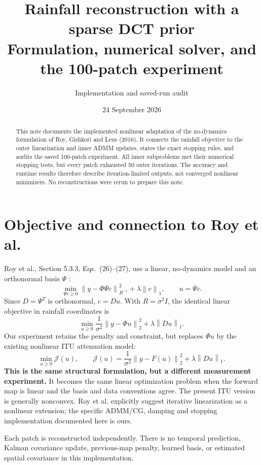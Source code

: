 \documentclass[11pt,a4paper]{article}
\title{Rainfall reconstruction with a sparse DCT prior\\\large Formulation, numerical solver, and the 100-patch experiment}
\author{Implementation and saved-run audit}
\date{24 September 2026}
\newcommand{\norm}[1]{\left\lVert#1\right\rVert}
\newcommand{\J}{\mathcal J}
\begin{document}
\maketitle
\begin{abstract}
This note documents the implemented nonlinear adaptation of the no-dynamics formulation of Roy, Gishkori and Leus (2016). It connects the rainfall objective to the outer linearization and inner ADMM updates, states the exact stopping rules, and audits the saved 100-patch experiment. All inner subproblems met their numerical stopping tests, but every patch exhausted 50 outer iterations. The accuracy and runtime results therefore describe iteration-limited outputs, not converged nonlinear minimizers. No reconstructions were rerun to prepare this note.
\end{abstract}
\clearpage\hypertarget{contents}{}\tableofcontents\clearpage
\section{Objective and connection to Roy et al.}
Roy et al., Section 5.3.3, Eqs.~(26)--(27), use a linear, no-dynamics model and an orthonormal basis $\Psi$ \cite{roy}:
\begin{equation}
 \min_{\Psi c\ge0}\norm{y-\Phi\Psi c}_{R^{-1}}^2+\lambda\norm{c}_1,
 \qquad u=\Psi c.\label{eq:roy}
\end{equation}
Since $D=\Psi^T$ is orthonormal, $c=Du$. With $R=\sigma^2 I$, the identical linear objective in rainfall coordinates is
\begin{equation}
 \min_{u\ge0}\frac{1}{\sigma^2}\norm{y-\Phi u}_2^2+\lambda\norm{Du}_1.
\end{equation}
Our experiment retains the penalty and constraint, but replaces $\Phi u$ by the existing nonlinear ITU attenuation model:
\begin{equation}
 \boxed{\min_{u\ge0}\J(u),\qquad
 \J(u)=\frac{1}{\sigma^2}\norm{y-F(u)}_2^2+\lambda\norm{Du}_1.}\label{eq:objective}
\end{equation}
\textbf{This is the same structural formulation, but a different measurement experiment.} It becomes the same linear optimization problem when the forward map is linear and the basis and data conventions agree. The present ITU version is generally nonconvex. Roy et al. explicitly suggest iterative linearization as a nonlinear extension; the specific ADMM/CG, damping and stopping implementation documented here is ours.

Each patch is reconstructed independently. There is no temporal prediction, Kalman covariance update, previous-map penalty, learned basis, or estimated spatial covariance in this implementation.
\clearpage
\end{document}
